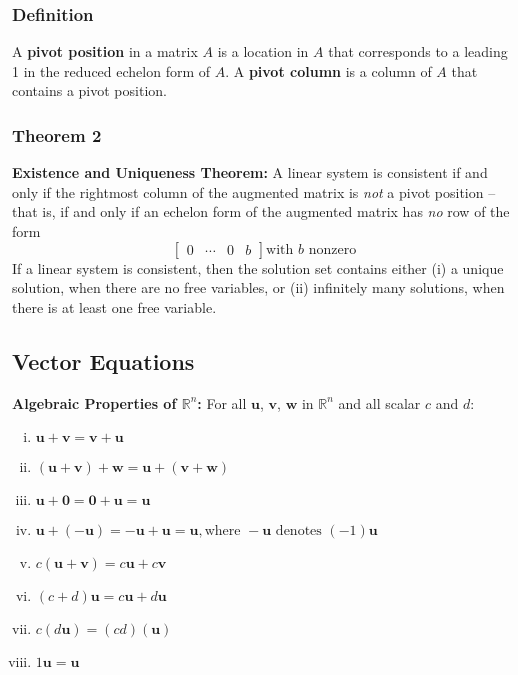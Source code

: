 \documentclass[letterpaper,11pt]{article}
\begin{document}
			\subsubsection{Definition}
				A \textbf{pivot position} in a matrix $A$ is a location in $A$ that corresponds to a leading 1 in the reduced echelon form of $A$. A \textbf{pivot column} is a column of $A$ that contains a pivot position.
			\subsubsection{Theorem 2}
				\textbf{Existence and Uniqueness Theorem:} A linear system is consistent if and only if the rightmost column of the augmented matrix is \textit{not} a pivot position -- that is, if and only if an echelon form of the augmented matrix has \textit{no} row of the form
				\begin{equation}
					\begin{bmatrix}
						0 & \cdots & 0 & b
					\end{bmatrix}
					\textrm{with } b \textrm{ nonzero}
				\end{equation}
				If a linear system is consistent, then the solution set contains either (i) a unique solution, when there are no free variables, or (ii) infinitely many solutions, when there is at least one free variable.
		\subsection{Vector Equations}
			\textbf{Algebraic Properties of $\mathbb{R}^n$:} For all $\mathbf{u}$, $\mathbf{v}$, $\mathbf{w}$ in $\mathbb{R}^n$ and all scalar $c$ and $d$:
			\begin{enumerate}[(i)]
				\item $\mathbf{u}+\mathbf{v}=\mathbf{v}+\mathbf{u}$
				\item $(\mathbf{u}+\mathbf{v})+\mathbf{w}=\mathbf{u}+(\mathbf{v}+\mathbf{w})$
				\item $\mathbf{u}+\mathbf{0}=\mathbf{0}+\mathbf{u}=\mathbf{u}$
				\item $\mathbf{u}+(-\mathbf{u})=-\mathbf{u}+\mathbf{u}=\mathbf{u},\textrm{where } -\mathbf{u} \textrm{ denotes } (-1)\mathbf{u}$
				\item $c(\mathbf{u}+\mathbf{v})=c\mathbf{u}+c\mathbf{v}$
				\item $(c+d)\mathbf{u}=c\mathbf{u}+d\mathbf{u}$
				\item $c(d\mathbf{u})=(cd)(\mathbf{u})$
				\item $1\mathbf{u}=\mathbf{u}$
			\end{enumerate}
			
\end{document}
